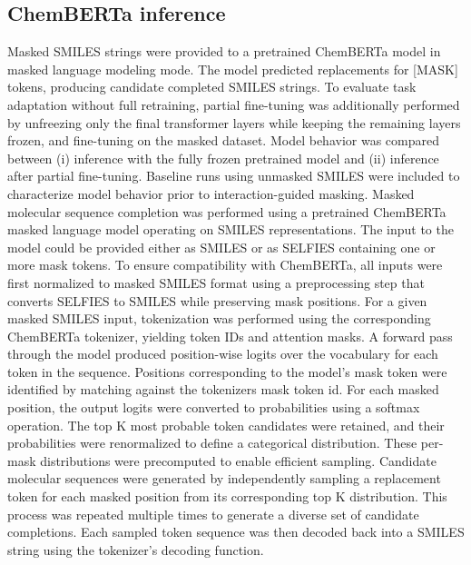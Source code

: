 \documentclass[a4paper,12pt]{article}
\begin{document}
\subsection{ChemBERTa inference }
Masked SMILES strings were provided to a pretrained ChemBERTa model in masked language modeling mode. The model predicted replacements for [MASK] tokens, producing candidate completed SMILES strings. To evaluate task adaptation without full retraining, partial fine-tuning was additionally performed by unfreezing only the final transformer layers while keeping the remaining layers frozen, and fine-tuning on the masked dataset. Model behavior was compared between (i) inference with the fully frozen pretrained model and (ii) inference after partial fine-tuning. Baseline runs using unmasked SMILES were included to characterize model behavior prior to interaction-guided masking. 
Masked molecular sequence completion was performed using a pretrained ChemBERTa masked language model operating on SMILES representations. The input to the model could be provided either as SMILES or as SELFIES containing one or more mask tokens. To ensure compatibility with ChemBERTa, all inputs were first normalized to masked SMILES format using a preprocessing step that converts SELFIES to SMILES while preserving mask positions.
For a given masked SMILES input, tokenization was performed using the corresponding ChemBERTa tokenizer, yielding token IDs and attention masks. A forward pass through the model produced position-wise logits over the vocabulary for each token in the sequence.
Positions corresponding to the model’s mask token were identified by matching against the tokenizers mask token id.
For each masked position, the output logits were converted to probabilities using a softmax operation. The top K most probable token candidates were retained, and their probabilities were renormalized to define a categorical distribution. These per-mask distributions were precomputed to enable efficient sampling.
Candidate molecular sequences were generated by independently sampling a replacement token for each masked position from its corresponding top K distribution. This process was repeated multiple times to generate a diverse set of candidate completions. Each sampled token sequence was then decoded back into a SMILES string using the tokenizer’s decoding function.
\end{document}
